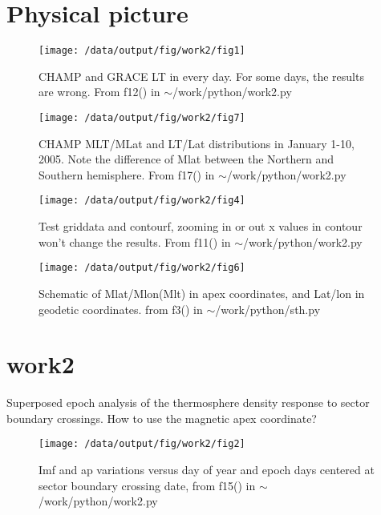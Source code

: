 \documentclass[12pt,a4paper]{article}
\begin{document}
\section{Physical picture}
\begin{figure}[!ht]
    \begin{center}
        \texttt{[image: /data/output/fig/work2/fig1]}
        \caption{CHAMP and GRACE LT in every day. For some days, the results are wrong. From f12() in $\sim$/work/python/work2.py}
    \end{center}
    \label{fig1}
\end{figure}

\begin{figure}[!ht]
    \begin{center}
        \texttt{[image: /data/output/fig/work2/fig7]}
        \caption{ CHAMP MLT/MLat and LT/Lat distributions in January 1-10, 2005. Note the difference of Mlat between the Northern and Southern hemisphere. From f17() in $\sim$/work/python/work2.py}
    \end{center}
    \label{fig7}
\end{figure}

\begin{figure}[!ht]
    \begin{center}
        \texttt{[image: /data/output/fig/work2/fig4]}
        \caption{Test griddata and contourf, zooming in or out x values in contour won't change the results. From f11() in $\sim$/work/python/work2.py}
    \end{center}
    \label{fig4}
\end{figure}

\begin{figure}[!ht]
    \begin{center}
        \texttt{[image: /data/output/fig/work2/fig6]}
        \caption{Schematic of Mlat/Mlon(Mlt) in apex coordinates, and Lat/lon in geodetic coordinates. from f3() in $\sim$/work/python/sth.py}
    \end{center}
    \label{fig6}
\end{figure}
\newpage

\section{work2}
Superposed epoch analysis of the thermosphere density response to sector boundary crossings.
How to use the magnetic apex coordinate?
\begin{figure}[!ht]
    \begin{center}
        \texttt{[image: /data/output/fig/work2/fig2]}
        \caption{Imf and ap variations versus day of year and epoch days centered at sector boundary crossing date, from f15() in $\sim$/work/python/work2.py}
    \end{center}
    \label{fig2}
\end{figure}
\end{document}

